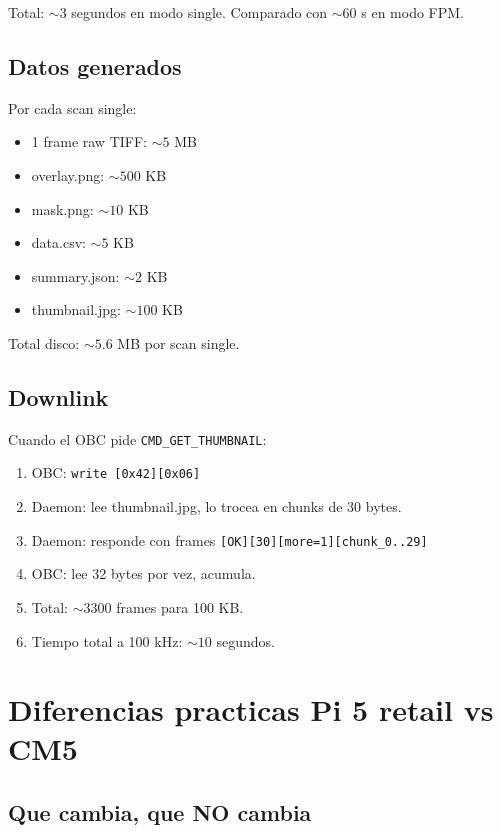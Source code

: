 \documentclass[11pt,a4paper,oneside,openright]{book}
\begin{document}
Total: $\sim 3$ segundos en modo single. Comparado con $\sim 60$ s en modo FPM.

\section{Datos generados}

Por cada scan single:

\begin{itemize}[leftmargin=2em]
  \item 1 frame raw TIFF: $\sim 5$ MB
  \item overlay.png: $\sim 500$ KB
  \item mask.png: $\sim 10$ KB
  \item data.csv: $\sim 5$ KB
  \item summary.json: $\sim 2$ KB
  \item thumbnail.jpg: $\sim 100$ KB
\end{itemize}

Total disco: $\sim 5.6$ MB por scan single.

\section{Downlink}

Cuando el OBC pide \texttt{CMD\_GET\_THUMBNAIL}:

\begin{enumerate}[leftmargin=2em]
  \item OBC: \texttt{write [0x42][0x06]}
  \item Daemon: lee thumbnail.jpg, lo trocea en chunks de 30 bytes.
  \item Daemon: responde con frames \texttt{[OK][30][more=1][chunk\_0..29]}
  \item OBC: lee 32 bytes por vez, acumula.
  \item Total: $\sim 3300$ frames para 100 KB.
  \item Tiempo total a 100 kHz: $\sim 10$ segundos.
\end{enumerate}

\chapter{Diferencias practicas Pi 5 retail vs CM5}
\label{ch:diferencias}

\section{Que cambia, que NO cambia}
\end{document}
